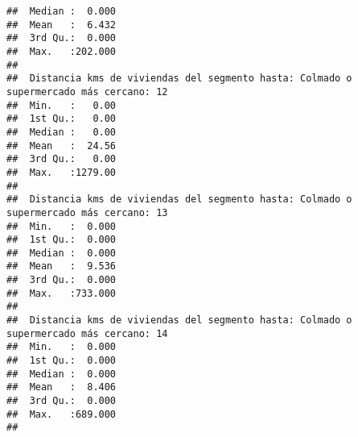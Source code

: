 \documentclass[11pt,]{article}
\begin{document}
\begin{verbatim}
##  Median :  0.000                                                                      
##  Mean   :  6.432                                                                      
##  3rd Qu.:  0.000                                                                      
##  Max.   :202.000                                                                      
##                                                                                       
##  Distancia kms de viviendas del segmento hasta: Colmado o supermercado más cercano: 12
##  Min.   :   0.00                                                                      
##  1st Qu.:   0.00                                                                      
##  Median :   0.00                                                                      
##  Mean   :  24.56                                                                      
##  3rd Qu.:   0.00                                                                      
##  Max.   :1279.00                                                                      
##                                                                                       
##  Distancia kms de viviendas del segmento hasta: Colmado o supermercado más cercano: 13
##  Min.   :  0.000                                                                      
##  1st Qu.:  0.000                                                                      
##  Median :  0.000                                                                      
##  Mean   :  9.536                                                                      
##  3rd Qu.:  0.000                                                                      
##  Max.   :733.000                                                                      
##                                                                                       
##  Distancia kms de viviendas del segmento hasta: Colmado o supermercado más cercano: 14
##  Min.   :  0.000                                                                      
##  1st Qu.:  0.000                                                                      
##  Median :  0.000                                                                      
##  Mean   :  8.406                                                                      
##  3rd Qu.:  0.000                                                                      
##  Max.   :689.000                                                                      
##                                                                                       

\end{verbatim}
\end{document}

